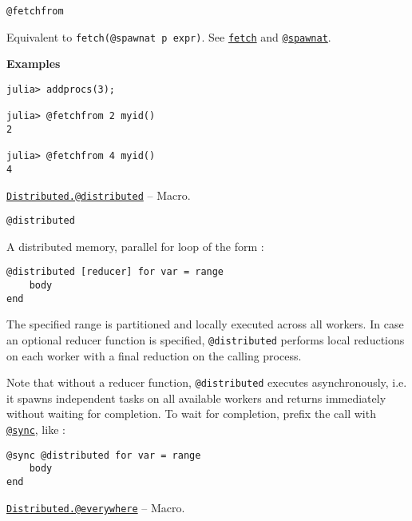 \begin{adjustwidth}{2em}{0pt}


\begin{verbatim}
@fetchfrom
\end{verbatim}

Equivalent to \texttt{fetch(@spawnat p expr)}. See \hyperlink{11007884648860062495}{\texttt{fetch}} and \hyperlink{11231712027010946923}{\texttt{@spawnat}}.

\textbf{Examples}


\begin{verbatim}
julia> addprocs(3);

julia> @fetchfrom 2 myid()
2

julia> @fetchfrom 4 myid()
4
\end{verbatim}



\end{adjustwidth}
\hypertarget{4581929266257108937}{}
\hyperlink{4581929266257108937}{\texttt{Distributed.@distributed}}  -- {Macro.}

\begin{adjustwidth}{2em}{0pt}


\begin{verbatim}
@distributed
\end{verbatim}

A distributed memory, parallel for loop of the form :


\begin{lstlisting}
@distributed [reducer] for var = range
    body
end
\end{lstlisting}

The specified range is partitioned and locally executed across all workers. In case an optional reducer function is specified, \texttt{@distributed} performs local reductions on each worker with a final reduction on the calling process.

Note that without a reducer function, \texttt{@distributed} executes asynchronously, i.e. it spawns independent tasks on all available workers and returns immediately without waiting for completion. To wait for completion, prefix the call with \hyperlink{7188613740509403855}{\texttt{@sync}}, like :


\begin{lstlisting}
@sync @distributed for var = range
    body
end
\end{lstlisting}



\end{adjustwidth}
\hypertarget{4972064255482407966}{}
\hyperlink{4972064255482407966}{\texttt{Distributed.@everywhere}}  -- {Macro.}

